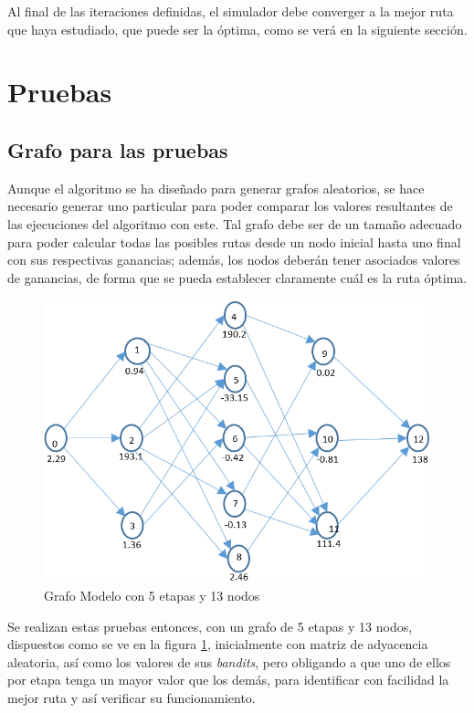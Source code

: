 Al final de las iteraciones definidas, el simulador debe converger a la mejor ruta que haya estudiado, que puede ser la óptima, como se verá en la siguiente sección.

\section{Pruebas}

\subsection{Grafo para las pruebas}

Aunque el algoritmo se ha diseñado para generar grafos aleatorios, se hace necesario generar uno particular para poder comparar los valores resultantes de las ejecuciones del algoritmo con este. Tal grafo debe ser de un tamaño adecuado para poder calcular todas las posibles rutas desde un nodo inicial hasta uno final con sus respectivas ganancias; además, los nodos deberán tener asociados valores de ganancias, de forma que se pueda establecer claramente cuál es la ruta óptima.

\begin{figure}[h]
  \centering
    \includegraphics[scale=0.5]{Grafo5L.png}
  \caption[Grafo Modelo]{Grafo Modelo con 5 etapas y 13 nodos}
  \label{Grafomodelo}
\end{figure}

Se realizan estas pruebas entonces, con un grafo de 5 etapas y 13 nodos, dispuestos como se ve en la figura \ref{Grafomodelo}, inicialmente con matriz de adyacencia aleatoria, así como los valores de sus \textit{bandits}, pero obligando a que uno de ellos por etapa tenga un mayor valor que los demás, para identificar con facilidad la mejor ruta y así verificar su funcionamiento.


